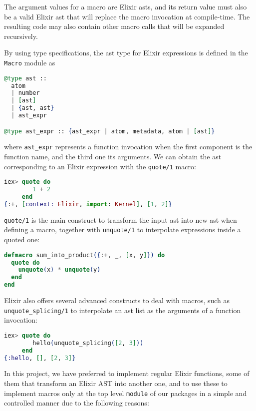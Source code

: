 The argument values for a macro are Elixir \gls{ast}s, and its return value must
also be a valid Elixir \gls{ast} that will replace the macro invocation at
compile-time. The resulting code may also contain other macro calls that will be
expanded recursively.

By using type specifications, the \gls{ast} type for Elixir expressions is
defined in the \verb|Macro| module as

\begin{lstlisting}[language=elixir,numbers=none,frame=none]
@type ast ::
  atom
  | number
  | [ast]
  | {ast, ast}
  | ast_expr

@type ast_expr :: {ast_expr | atom, metadata, atom | [ast]}
\end{lstlisting}

where \verb|ast_expr| represents a function invocation when the first component
is the function name, and the third one its arguments. We can obtain the
\gls{ast} corresponding to an Elixir expression with the \verb|quote/1| macro:

\begin{lstlisting}[language=elixir,numbers=none,frame=none]
iex> quote do 
        1 + 2
     end
{:+, [context: Elixir, import: Kernel], [1, 2]}
\end{lstlisting}

\verb|quote/1| is the main construct to transform the input \gls{ast} into new
\gls{ast} when defining a macro, together with \verb|unquote/1| to interpolate
expressions inside a quoted one:

\begin{lstlisting}[language=elixir,numbers=none,frame=none]
defmacro sum_into_product({:+, _, [x, y]}) do
  quote do
    unquote(x) * unquote(y)
  end
end
\end{lstlisting}

Elixir also offers several advanced constructs to deal with macros, such as
\verb|unquote_splicing/1| to interpolate an \gls{ast} list as the arguments of a
function invocation:

\begin{lstlisting}[language=elixir,numbers=none,frame=none]
iex> quote do
        hello(unquote_splicing([2, 3]))
     end
{:hello, [], [2, 3]}
\end{lstlisting}

In this project, we have preferred to implement regular Elixir functions, some 
of them that transform an Elixir AST into another one, and to use these to
implement macros only at the top level \verb|module| of our packages in a simple
and controlled manner due to the following reasons:

